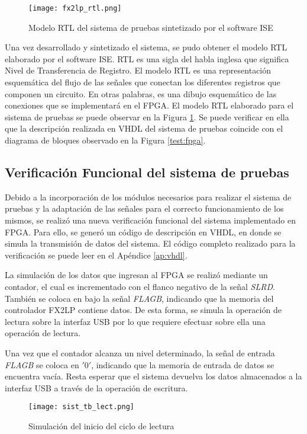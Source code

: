 		\begin{figure}[b]
			\centering
			\texttt{[image: fx2lp\_rtl.png]}
			\caption{Modelo RTL del sistema de pruebas sintetizado por el software ISE}
			\label{test:rtl}
		\end{figure}
	
		Una vez desarrollado y sintetizado el sistema, se pudo obtener el modelo RTL elaborado por el software ISE. RTL es una sigla del habla inglesa que significa Nivel de Transferencia de Registro. El modelo RTL es una representación esquemática del flujo de las señales que conectan los diferentes registros que componen un circuito. En otras palabras, es una dibujo esquemático de las conexiones que se implementará en el FPGA. El modelo RTL elaborado para el sistema de pruebas se puede observar en la Figura \ref{test:rtl}. Se puede verificar en ella que la descripción realizada en VHDL del sistema de pruebas coincide con el diagrama de bloques observado en la Figura \ref{test:fpga}.
		
\subsection{Verificación Funcional del sistema de pruebas}
	Debido a la incorporación de los módulos necesarios para realizar el sistema de pruebas y la adaptación de las señales para el correcto funcionamiento de los mismos, se realizó una nueva verificación funcional del sistema implementado en FPGA. Para ello, se generó un código de descripción en VHDL, en donde se simula la transmisión de datos del sistema. El código completo realizado para la verificación se puede leer en el Apéndice \ref{ap:vhdl}.
	
	La simulación de los datos que ingresan al FPGA se realizó mediante un contador, el cual es incrementado con el flanco negativo de la señal \textit{SLRD}. También se coloca en bajo la señal \textit{FLAGB}, indicando que la memoria del controlador FX2LP contiene datos. De esta forma, se simula la operación de lectura sobre la interfaz USB por lo que requiere efectuar sobre ella una operación de lectura.
	
	Una vez que el contador alcanza un nivel determinado, la señal de entrada \textit{FLAGB} se coloca en $'0'$, indicando que la memoria de entrada de datos se encuentra vacía. Resta esperar que el sistema devuelva los datos almacenados a la interfaz USB a través de la operación de escritura.
	
	\begin{figure}[t]
		\centering
		\texttt{[image: sist\_tb\_lect.png]}
		\caption{Simulación del inicio del ciclo de lectura}
		\label{test:tb:lect}
	\end{figure}

